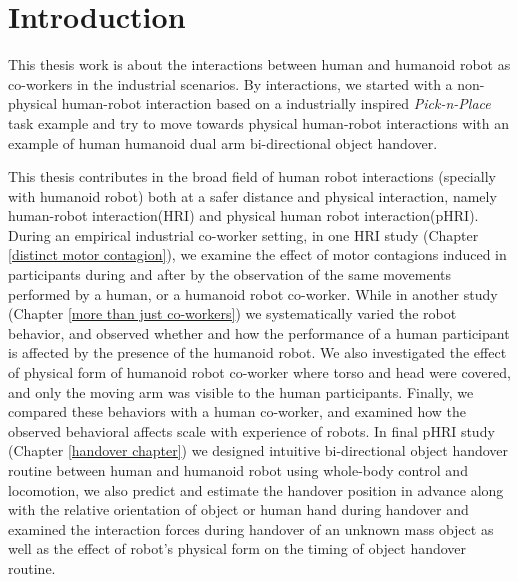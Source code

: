 \documentclass[a4paper, 12pt, oneside]{Thesis}  %
\begin{document}
\mainmatter	  %

\pagestyle{fancy}  %


{\color{blue}\chapter*{Introduction}}

This thesis work is about the interactions between human and humanoid robot as co-workers in the industrial scenarios. By interactions, we started with a non-physical human-robot interaction based on a industrially inspired \textit{Pick-n-Place} task example and try to move towards physical human-robot interactions with an example of human humanoid dual arm bi-directional object handover.

This thesis contributes in the broad field of human robot interactions (specially with humanoid robot) both at a safer distance and physical interaction, namely human-robot interaction(HRI) and physical human robot interaction(pHRI). During an empirical industrial co-worker setting, in one HRI study (Chapter \ref{distinct motor contagion}), we examine the effect of motor contagions induced in participants during and after by the observation of the same movements performed by a human, or a humanoid robot co-worker. While in  another study (Chapter \ref{more than just co-workers}) we systematically varied the robot behavior, and observed whether and how the performance of a human participant is affected by the presence of the humanoid robot. We also investigated the effect of physical form of humanoid robot co-worker where torso and head were covered, and only the moving arm was visible to the human participants. Finally, we compared these behaviors with a human co-worker, and examined how the observed behavioral affects scale with experience of robots. In final pHRI study (Chapter \ref{handover chapter}) we designed intuitive bi-directional object handover routine between human and humanoid robot using whole-body control and locomotion, we also predict and estimate the handover position in advance along with the relative orientation of object or human hand during handover and examined the interaction forces during handover of an unknown mass object as well as the effect of robot's physical form on the timing of object handover routine.
\end{document}
